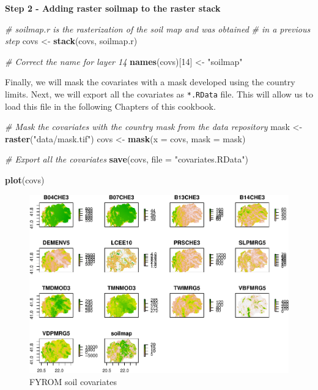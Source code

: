 \documentclass[10pt,b5paper,]{book}
\newenvironment{Shaded}{\begin{snugshade}}{\end{snugshade}}
\newcommand{\CommentTok}[1]{\textcolor[rgb]{0.56,0.35,0.01}{\textit{#1}}}
\newcommand{\DataTypeTok}[1]{\textcolor[rgb]{0.13,0.29,0.53}{#1}}
\newcommand{\DecValTok}[1]{\textcolor[rgb]{0.00,0.00,0.81}{#1}}
\newcommand{\KeywordTok}[1]{\textcolor[rgb]{0.13,0.29,0.53}{\textbf{#1}}}
\newcommand{\NormalTok}[1]{#1}
\newcommand{\StringTok}[1]{\textcolor[rgb]{0.31,0.60,0.02}{#1}}
\theoremstyle{definition}
\theoremstyle{definition}
\theoremstyle{definition}
\theoremstyle{remark}
\begin{document}
\textbf{Step 2 - Adding raster soilmap to the raster stack}

\begin{Shaded}
\begin{Highlighting}[]
\CommentTok{# soilmap.r is the rasterization of the soil map and was obtained}
\CommentTok{# in a previous step}
\NormalTok{covs <-}\StringTok{ }\KeywordTok{stack}\NormalTok{(covs, soilmap.r)}

\CommentTok{# Correct the name for layer 14}
\KeywordTok{names}\NormalTok{(covs)[}\DecValTok{14}\NormalTok{] <-}\StringTok{ "soilmap"}
\end{Highlighting}
\end{Shaded}

Finally, we will mask the covariates with a mask developed using the
country limits. Next, we will export all the covariates as
\texttt{*.RData} file. This will allow us to load this file in the
following Chapters of this cookbook.

\begin{Shaded}
\begin{Highlighting}[]
\CommentTok{# Mask the covariates with the country mask from the data repository}
\NormalTok{mask <-}\StringTok{ }\KeywordTok{raster}\NormalTok{(}\StringTok{"data/mask.tif"}\NormalTok{)}
\NormalTok{covs <-}\StringTok{ }\KeywordTok{mask}\NormalTok{(}\DataTypeTok{x =}\NormalTok{ covs, }\DataTypeTok{mask =}\NormalTok{ mask)}

\CommentTok{# Export all the covariates }
\KeywordTok{save}\NormalTok{(covs, }\DataTypeTok{file =} \StringTok{"covariates.RData"}\NormalTok{)}

\KeywordTok{plot}\NormalTok{(covs)}
\end{Highlighting}
\end{Shaded}

\begin{figure}
\centering
\includegraphics{SOCMapping_files/figure-latex/unnamed-chunk-26-1.pdf}
\caption{\label{fig:unnamed-chunk-26}FYROM soil covariates}
\end{figure}
\end{document}
